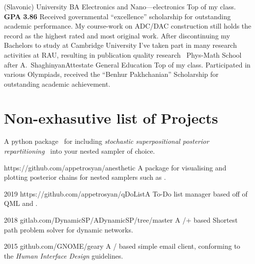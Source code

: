 \documentclass{CurriculumVitae}[10pt, draft, condensed]
\begin{document}
{{     (Slavonic) University} {BA }{Electronics and
     Nano---electronics} {Top of my class. \textbf{GPA} \textbf{3.86}
     Received governmental ``excellence'' scholarship for outstanding
     academic performance. My course-work on ADC/DAC construction
     still holds the record as the highest rated and most original
     work. After discontinuing my Bachelors to study at Cambridge
     University I've taken part in many research activities at RAU,
     resulting in publication quality
     research~\cite{cu2o,measurement}} 
   {Phys-Math School after A.~Shaghinyan}{Attestate }{General
     Education} {Top of my class. Participated in various Olympiads,
     received the ``Benhur Pakhchanian'' Scholarship for outstanding
     academic achievement. }

\section*{Non-exhasutive list of Projects}%
%


 {A
  python package~\cite{sspr-joss} for including \emph{stochastic
    superpositional posterior repartitioning}~\cite{sspr} into your
  nested sampler of choice.}

 {https://github.com/appetrosyan/anesthetic}
{A package for visualising and plotting posterior chains for nested
  samplers such as .}

 {2019} {https://github.com/appetrosyan/qDoList}{A
  To-Do list manager based off of QML and .}

 {2018}
{gitlab.com/DynamicSP/ADynamicSP/tree/master} {A
  /+ based Shortest path problem solver for
  dynamic networks. }

 {2015} {github.com/GNOME/geary} {A
  / based simple email client, conforming to the
   \emph{Human Interface Design} guidelines.}



}
\end{document}
